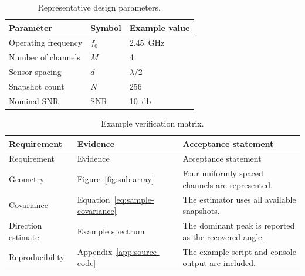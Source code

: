 \begin{table}[H]
    \centering
    \caption{Representative design parameters.}
    \label{tab:design-parameters}
    \begin{tabular}{@{}lll@{}}
        \toprule
        Parameter & Symbol & Example value \\
        \midrule
        Operating frequency & $f_0$ & \SI{2.45}{\giga\hertz} \\
        Number of channels & $M$ & 4 \\
        Sensor spacing & $d$ & $\lambda/2$ \\
        Snapshot count & $N$ & 256 \\
        Nominal SNR & $\mathrm{SNR}$ & \SI{10}{\decibel} \\
        \bottomrule
    \end{tabular}
\end{table}

\begin{longtable}{@{}p{}p{}p{}@{}}
\caption{Example verification matrix.}\label{tab:verification-matrix}\\
\toprule
Requirement & Evidence & Acceptance statement \\
\midrule
\endfirsthead
\toprule
Requirement & Evidence & Acceptance statement \\
\midrule
\endhead
Geometry & Figure~\ref{fig:sub-array} & Four uniformly spaced channels are represented. \\
Covariance & Equation~\eqref{eq:sample-covariance} & The estimator uses all available snapshots. \\
Direction estimate & Example spectrum & The dominant peak is reported as the recovered angle. \\
Reproducibility & Appendix~\ref{app:source-code} & The example script and console output are included. \\
\bottomrule
\end{longtable}
